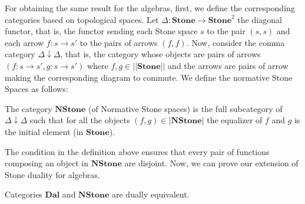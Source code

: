 For obtaining the same result for the \DAL algebras, first,  we define the corresponding categories based on topological spaces.  Let $\Delta : \mathbf{Stone} \rightarrow \mathbf{Stone}^2$ the diagonal functor, that is, the functor sending each Stone space $s$ to the pair $(s,s)$ and each arrow $f:s \rightarrow s'$ to the pairs of arrows $(f,f)$.  Now, consider the comma category $\Delta \downarrow \Delta$, that is, the category whose objects are pairs of arrows $(f:s\rightarrow s', g: s \rightarrow s')$ where $f,g \in ||\mathbf{Stone}||$ and the arrows are pairs of arrow making the corresponding diagram to commute.  We define the normative Stone Spaces as follows:
\begin{definition} The category $\mathbf{NStone}$ (of Normative Stone spaces) is the full subcategory of $\Delta \downarrow \Delta$ such that for all the objects $(f,g) \in |\mathbf{NStone}|$ the equalizer of $f$ and $g$  is the initial element (in $\mathbf{Stone}$).
\end{definition} 
The condition in the definition above ensures that  every pair of functions composing an object in $\mathbf{NStone}$ are disjoint.  Now, we can prove our extension of Stone duality for \DAL algebras.
\begin{theorem}\label{theorem:duality} Categories $\mathbf{Dal}$ and $\mathbf{NStone}$ are dually equivalent.
\end{theorem}
